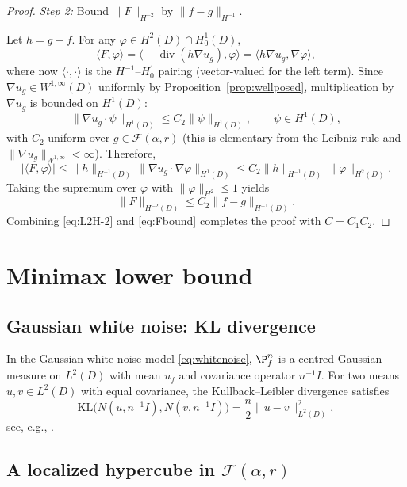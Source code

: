 \documentclass[11pt]{article}
\theoremstyle{definition}
\theoremstyle{remark}
\DeclareMathOperator{\diver}{div}
\newcommand{\1}{\mathbf{1}}
\begin{document}
\begin{proof}
\medskip\noindent
\emph{Step 2:} Bound $\|F\|_{H^{-2}}$ by $\|f-g\|_{H^{-1}}$.

Let $h=g-f$. For any $\varphi\in H^2(D)\cap H_0^1(D)$,
\[
\langle F,\varphi\rangle
= \Big\langle -\diver(h\nabla u_g),\varphi\Big\rangle
= \langle h\nabla u_g,\nabla \varphi\rangle,
\]
where now $\langle\cdot,\cdot\rangle$ is the $H^{-1}$--$H_0^1$ pairing (vector-valued for the left term).
Since $\nabla u_g\in W^{1,\infty}(D)$ uniformly by Proposition~\ref{prop:wellposed}, multiplication by $\nabla u_g$ is bounded on $H^1(D)$:
\[
\|\nabla u_g\cdot \psi\|_{H^1(D)}\le C_2 \|\psi\|_{H^1(D)},\qquad \psi\in H^1(D),
\]
with $C_2$ uniform over $g\in\mathcal F(\alpha,r)$ (this is elementary from the Leibniz rule and $\|\nabla u_g\|_{W^{1,\infty}}<\infty$). Therefore,
\[
|\langle F,\varphi\rangle|
\le \|h\|_{H^{-1}(D)}\,\|\nabla u_g\cdot\nabla\varphi\|_{H^1(D)}
\le C_2 \|h\|_{H^{-1}(D)}\,\|\varphi\|_{H^2(D)}.
\]
Taking the supremum over $\varphi$ with $\|\varphi\|_{H^2}\le1$ yields
\begin{equation}\label{eq:Fbound}
\|F\|_{H^{-2}(D)}\le C_2 \|f-g\|_{H^{-1}(D)}.
\end{equation}
Combining \eqref{eq:L2H-2} and \eqref{eq:Fbound} completes the proof with $C=C_1C_2$.
\end{proof}

\section{Minimax lower bound}\label{sec:lower}

\subsection{Gaussian white noise: KL divergence}
In the Gaussian white noise model \eqref{eq:whitenoise}, $\P_f^n$ is a centred Gaussian measure on $L^2(D)$ with mean $u_f$ and covariance operator $n^{-1}I$. For two means $u,v\in L^2(D)$ with equal covariance, the Kullback--Leibler divergence satisfies
\begin{equation}\label{eq:kl}
\mathrm{KL}\bigl(N(u,n^{-1}I),N(v,n^{-1}I)\bigr)=\frac n2 \|u-v\|_{L^2(D)}^2,
\end{equation}
see, e.g., \cite[Lemma~2.7]{Tsybakov2009}.

\subsection{A localized hypercube in $\mathcal F(\alpha,r)$}
\end{document}

